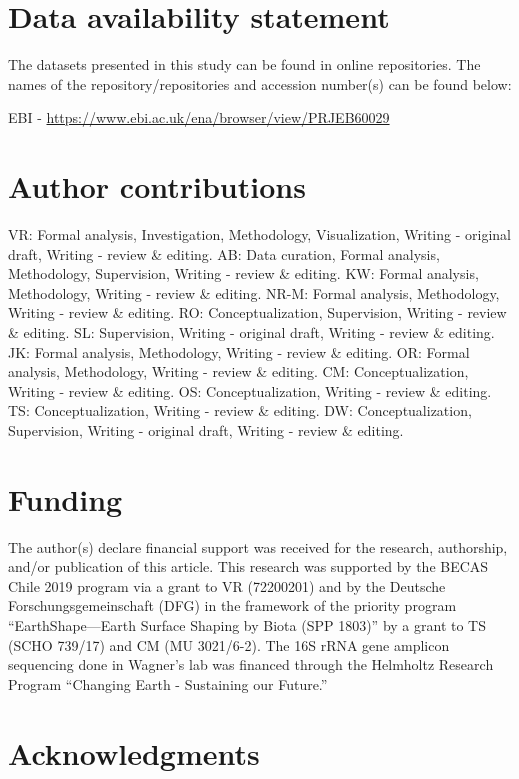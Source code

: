 \section*{Data availability statement}

The datasets presented in this study can be found in online repositories. The names of the repository/repositories and accession number(s) can be found below: 

EBI - \url{https://www.ebi.ac.uk/ena/browser/view/PRJEB60029}

\section*{Author contributions}

VR: Formal analysis, Investigation, Methodology, Visualization, Writing - original draft, Writing - review \& editing. AB: Data curation, Formal analysis, Methodology, Supervision, Writing - review & editing. KW: Formal analysis, Methodology, Writing - review \& editing. NR-M: Formal analysis, Methodology, Writing - review \& editing. RO: Conceptualization, Supervision, Writing - review \& editing. SL: Supervision, Writing - original draft, Writing - review \& editing. JK: Formal analysis, Methodology, Writing - review \& editing. OR: Formal analysis, Methodology, Writing - review \& editing. CM: Conceptualization, Writing - review \& editing. OS: Conceptualization, Writing - review \& editing. TS: Conceptualization, Writing - review \& editing. DW: Conceptualization, Supervision, Writing - original draft, Writing - review \& editing.

\section*{Funding}

The author(s) declare financial support was received for the research, authorship, and/or publication of this article. This research was supported by the BECAS Chile 2019 program via a grant to VR (72200201) and by the Deutsche Forschungsgemeinschaft (DFG) in the framework of the priority program “EarthShape—Earth Surface Shaping by Biota (SPP 1803)” by a grant to TS (SCHO 739/17) and CM (MU 3021/6-2). The 16S rRNA gene amplicon sequencing done in Wagner's lab was financed through the Helmholtz Research Program “Changing Earth - Sustaining our Future.”

\section*{Acknowledgments}

